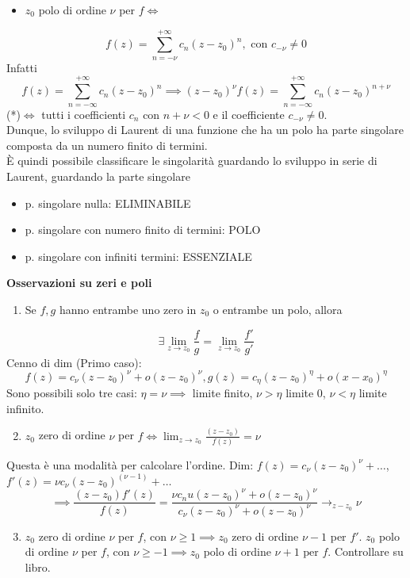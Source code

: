 \documentclass[a4paper]{article}
\begin{document}
\begin{itemize}
	\item $z_0$ polo di ordine $\nu$ per $f \iff$
\end{itemize}
\[f(z)=\sum_{n=-\nu}^{+\infty} c_n(z-z_0)^n,\text{ con }c_{-\nu}\neq 0\]
Infatti 
\[f(z)=\sum_{n=-\infty}^{+\infty} c_n(z-z_0)^n\implies(z-z_0)^\nu f(z)=\sum_{n=-\infty}^{+\infty} c_n(z-z_0)^{n+\nu}\]
(*)$\iff$ tutti i coefficienti $c_n$ con $n+\nu<0$ e il coefficiente $c_{-\nu}\neq 0$.
\\Dunque, lo sviluppo di Laurent di una funzione che ha un polo ha parte singolare composta da un numero finito di termini.
\\È quindi possibile classificare le singolarità guardando lo sviluppo in serie di Laurent, guardando la parte singolare
\begin{itemize}
	\item p. singolare nulla: ELIMINABILE
	\item p. singolare con numero finito di termini: POLO
	\item p. singolare con infiniti termini: ESSENZIALE
\end{itemize}
\textbf{Osservazioni su zeri e poli} 
\begin{enumerate}
	\item Se $f,g$ hanno entrambe uno zero in $z_0$ o entrambe un polo, allora
\end{enumerate}
\[\exists  \lim_{z \to z_0} \frac{f}{g}=\lim_{z \to z_0} \frac{f'}{g'}\]
Cenno di dim (Primo caso):
\[f(z)=c_\nu(z-z_0)^\nu+o(z-z_0)^\nu, g(z)=c_\eta(z-z_0)^\eta+o(x-x_0)^\eta\]
Sono possibili solo tre casi: $\eta=\nu\implies$ limite finito, $\nu>\eta$ limite 0, $\nu < \eta$ limite infinito.
\begin{enumerate}
	\setcounter{enumi}{1}
	\item $z_0$ zero di ordine $\nu$ per $f \iff \lim_{z \to z_0} \frac{(z-z_0)}{f(z)}=\nu$
		\\
\end{enumerate}
Questa è una modalità per calcolare l'ordine.
Dim: $f(z)=c_\nu(z-z_0)^\nu+\ldots$, $f'(z)=\nu c_\nu(z-z_0)^{(\nu-1)}+\ldots$
\[\implies \frac{(z-z_0)f'(z)}{f(z)}=\frac{\nu c_nu(z-z_0)^\nu+o(z-z_0)^\nu}{c_\nu(z-z_0)^\nu+o(z-z_0)^\nu}\to_{z-z_0}\nu\]
\begin{enumerate}
	\setcounter{enumi}{2}
	\item $z_0$ zero di ordine $\nu$ per $f$, con $\nu \ge 1\implies z_0$ zero di ordine $\nu-1$ per $f'$.
$z_0$ polo di ordine $\nu$ per $f$, con $\nu \ge -1\implies z_0$ polo di ordine $\nu+1\text{ per }f$.
Controllare su libro.
\end{enumerate} 
\end{document}
